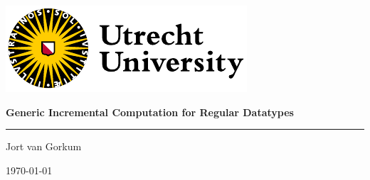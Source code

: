 \begin{frame}
\includegraphics[height=.7cm]{images/UU_logo_2021_EN_RGB.pdf}%
\vspace*{\fill}

\large \textbf{Generic Incremental Computation for Regular Datatypes}

\textcolor{yelloworange}{\rule{\textwidth}{0.2mm}}

\vspace*{0.5cm}

Jort van Gorkum

\vspace*{0.3cm}

\small \today
\end{frame}